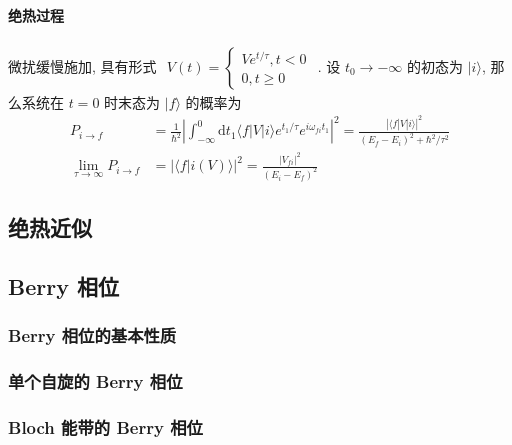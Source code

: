 \documentclass[../../main.tex]{subfiles}
\begin{document}
\paragraph{绝热过程}
微扰缓慢施加, 具有形式 $\begin{aligned}
    V(t) = \left\{\begin{aligned}
        Ve^{t/\tau}, t < 0\\
        0, t \geq 0
    \end{aligned}\right.
\end{aligned}$. 设 $t_{0}\rightarrow -\infty$ 的初态为 $|i\rangle$, 那么系统在 $t = 0$ 时末态为 $|f\rangle$ 的概率为
\begin{align*}
    P_{i\rightarrow f} &= \frac{1}{\hbar^{2}}\left|\int_{-\infty}^{0}\mathrm{d}t_{1}\langle f|V|i\rangle e^{t_{1}/\tau} e^{i\omega_{fi}t_{1}}\right|^{2} = \frac{|\langle f|V|i\rangle|^{2}}{(E_{f}-E_{i})^{2} + \hbar^{2}/\tau^{2}}\\
    \lim_{\tau\rightarrow\infty}P_{i\rightarrow f} &= |\langle f|i(V)\rangle|^{2} = \frac{|V_{fi}|^{2}}{(E_{i}-E_{f})^{2}}
\end{align*}
\subsection{绝热近似}

\subsection{Berry 相位}
\subsubsection{Berry 相位的基本性质}
\subsubsection{单个自旋的 Berry 相位}
\subsubsection{Bloch 能带的 Berry 相位}
\end{document}
